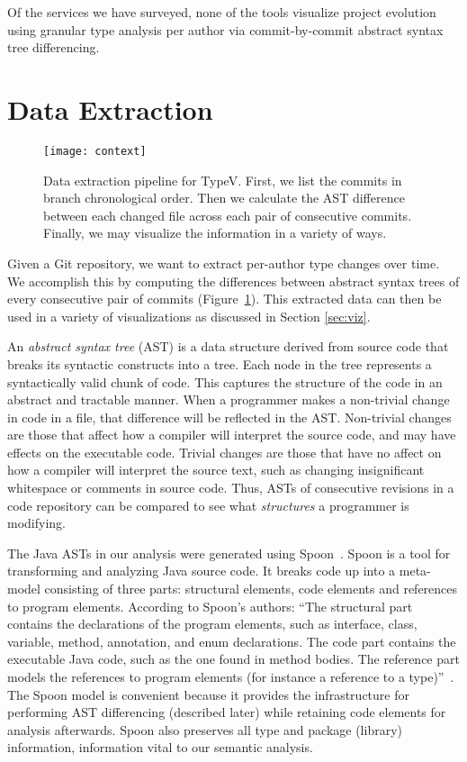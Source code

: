 Of the services we have surveyed, none of the tools visualize project evolution using granular type analysis per author via commit-by-commit abstract syntax tree differencing. 

\section{Data Extraction}
\label{sec:methodology}

\begin{figure}[!h]
\centering
\texttt{[image: context]}
\caption{Data extraction pipeline for TypeV. First, we list the commits in branch chronological order. Then we calculate the AST difference between each changed file across each pair of consecutive commits. Finally, we may visualize the information in a variety of ways.}
\label{fig:context}
\end{figure}

Given a Git repository, we want to extract per-author type changes over time. We accomplish this by computing the differences between abstract syntax trees of every consecutive pair of commits (Figure~\ref{fig:context}). This extracted data can then be used in a variety of visualizations as discussed in Section \ref{sec:viz}.

An \emph{abstract syntax tree} (AST) is a data structure derived from source code that breaks its syntactic constructs into a tree. Each node in the tree represents a syntactically valid chunk of code. This captures the structure of the code in an abstract and tractable manner. When a programmer makes a non-trivial change in code in a file, that difference will be reflected in the AST. Non-trivial changes are those that affect how a compiler will interpret the source code, and may have effects on the executable code. Trivial changes are those that have no affect on how a compiler will interpret the source text, such as changing insignificant whitespace or comments in source code. Thus, ASTs of consecutive revisions in a code repository can be compared to see what \emph{structures} a programmer is modifying.

The Java ASTs in our analysis were generated using Spoon~\cite{pawlak:hal-01169705}. Spoon is a tool for transforming and analyzing Java source code. It breaks code up into a meta-model consisting of three parts: structural elements, code elements and references to program elements. According to Spoon's authors: ``The structural part contains the declarations of the program elements, such as interface, class, variable, method, annotation, and enum declarations.  The code part contains the executable Java code, such as the one found in method bodies. The reference part models the references to program elements (for instance a reference to a type)''~\cite{pawlak:hal-01169705}. The Spoon model is convenient because it provides the infrastructure for performing AST differencing (described later) while retaining code elements for analysis afterwards. Spoon also preserves all type and package (library) information, information vital to our semantic analysis.

